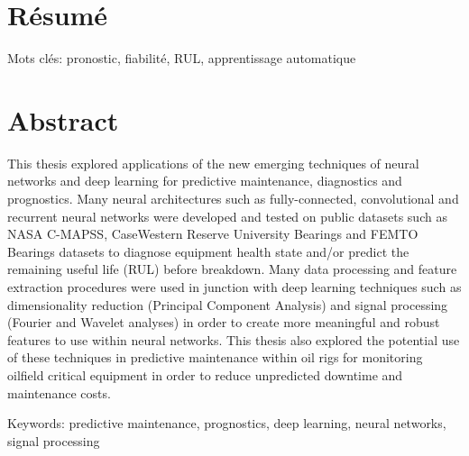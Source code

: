 \chapter*{Résumé}
\vspace{-2cm}


Mots clés: pronostic, fiabilité, RUL, apprentissage automatique

{\let\clearpage\relax\chapter*{Abstract}}
\vspace{-2cm}
This thesis explored applications of the new emerging techniques of neural networks and deep learning for predictive maintenance, diagnostics and prognostics. Many neural architectures such as fully-connected, convolutional and recurrent neural networks were developed and tested on public datasets such as NASA C-MAPSS, CaseWestern Reserve University Bearings and FEMTO Bearings datasets to diagnose equipment health state and/or predict the remaining useful life (RUL) before breakdown. Many data processing and feature extraction procedures were used in junction with deep learning techniques such as dimensionality reduction (Principal Component Analysis) and signal processing (Fourier and Wavelet analyses) in order to create more meaningful and robust features to use within neural networks. This thesis also explored the potential use of these techniques in predictive maintenance within oil rigs for monitoring oilfield critical equipment in order to reduce unpredicted downtime and maintenance costs.

Keywords: predictive maintenance, prognostics, deep learning, neural networks, signal processing
